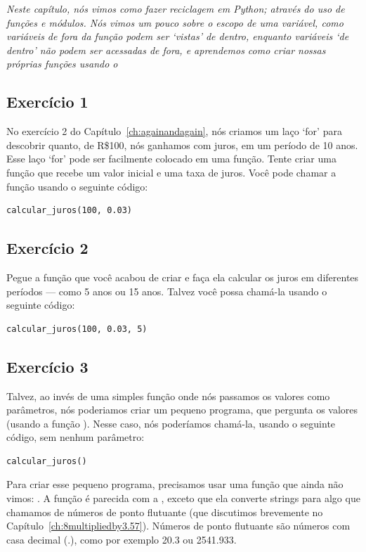 \emph{Neste capítulo, nós vimos como fazer reciclagem em Python; através do uso de funções e módulos. Nós vimos um pouco sobre o escopo de uma variável, como variáveis de fora da função podem ser `vistas' de dentro, enquanto variáveis `de dentro' não podem ser acessadas de fora, e aprendemos como criar nossas próprias funções usando o }

\subsection*{Exercício 1}
No exercício 2 do Capítulo~\ref{ch:againandagain}, nós criamos um laço `for' para descobrir quanto, de R\$100, nós ganhamos com juros, em um período de 10 anos. Esse laço `for' pode ser facilmente colocado em uma função. Tente criar uma função que recebe um valor inicial e uma taxa de juros. Você pode chamar a função usando o seguinte código:

\begin{listing}
\begin{verbatim}
calcular_juros(100, 0.03)
\end{verbatim}
\end{listing}

\subsection*{Exercício 2}
Pegue a função que você acabou de criar e faça ela calcular os juros em diferentes períodos --- como 5 anos ou 15 anos. Talvez você possa chamá-la usando o seguinte código:

\begin{listing}
\begin{verbatim}
calcular_juros(100, 0.03, 5)
\end{verbatim}
\end{listing}

\subsection*{Exercício 3}
Talvez, ao invés de uma simples função onde nós passamos os valores como parâmetros, nós poderiamos criar um pequeno programa, que pergunta os valores (usando a função ). Nesse caso, nós poderíamos chamá-la, usando o seguinte código, sem nenhum parâmetro:

\begin{listing}
\begin{verbatim}
calcular_juros()
\end{verbatim}
\end{listing}

\noindent
Para criar esse pequeno programa, precisamos usar uma função que ainda não vimos: . A função  é parecida com a , exceto que ela converte strings para algo que chamamos de números de ponto flutuante (que discutimos brevemente no Capítulo~\ref{ch:8multipliedby3.57}). Números de ponto flutuante são números com casa decimal (.), como por exemplo 20.3 ou 2541.933.

\newpage
